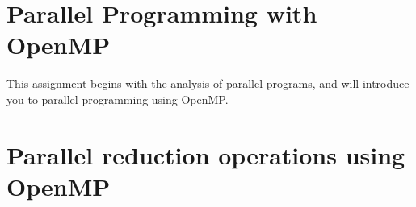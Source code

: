 \documentclass[unicode,11pt,a4paper,oneside,numbers=endperiod,openany]{scrartcl}
\begin{document}
\setassignment
{}

\newline

\section*{Parallel Programming with OpenMP }
This assignment begins with the analysis of parallel programs, and
will introduce you to parallel programming using OpenMP. 

\section{Parallel reduction operations using OpenMP }
\end{document}
